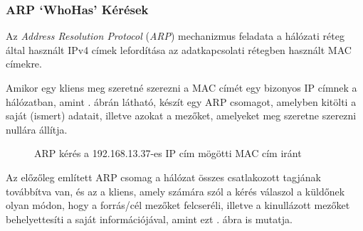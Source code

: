 \subsubsection*{ARP `WhoHas' Kérések} \label{ssec:arpping}

	Az \textit{Address Resolution Protocol} (\textit{ARP}) mechanizmus feladata a hálózati réteg által használt IPv4 címek lefordítása az adatkapcsolati rétegben használt MAC címekre.
	
	Amikor egy kliens meg szeretné szerezni a MAC címét egy bizonyos IP címnek a hálózatban, amint \az{\ref{arpreq}}. ábrán látható, készít egy ARP csomagot, amelyben kitölti a saját (ismert) adatait, illetve azokat a mezőket, amelyeket meg szeretne szerezni nullára állítja.
	
	\begin{figure}[!htbp]
		\centering
		\caption{ARP kérés a 192.168.13.37-es IP cím mögötti MAC cím iránt}
		\label{arpreq}
	\end{figure}
	
	Az előzőleg említett ARP csomag a hálózat összes csatlakozott tagjának továbbítva van, és az a kliens, amely számára szól a kérés válaszol a küldőnek olyan módon, hogy a forrás/cél mezőket felcseréli, illetve a kinullázott mezőket behelyettesíti a saját információjával, amint ezt \az{\ref{arpresp}}. ábra is mutatja. 
	
